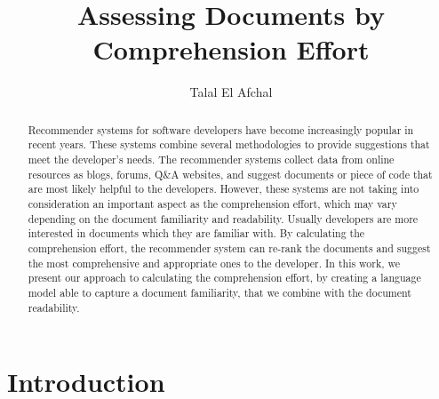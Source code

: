 \documentclass[12pt,mscthesis]{usiinfthesis}
\title{Assessing Documents by Comprehension Effort } %
\author{Talal El Afchal} %
\begin{document}
\maketitle %

\frontmatter %

\begin{abstract}
Recommender systems for software developers have become increasingly popular in recent years. These systems combine several methodologies to provide suggestions that meet the developer's needs. The recommender systems collect data from online resources as blogs, forums, Q\&A websites, and suggest documents or piece of code that are most likely helpful to the developers. However, these systems are not taking into consideration an important aspect as the comprehension effort, which may vary depending on the document familiarity and readability. Usually developers are more interested in documents which they are familiar with. By calculating the comprehension effort, the recommender system can re-rank the documents and suggest the most comprehensive and appropriate ones to the developer. In this work, we present our approach to calculating the comprehension effort, by creating a language model able to capture a document familiarity, that we combine with the document readability. 
\end{abstract}

\begin{acknowledgements}
\end{acknowledgements}

\tableofcontents 
\listoffigures %
\listoftables %

\mainmatter

\chapter{Introduction}
\end{document}
